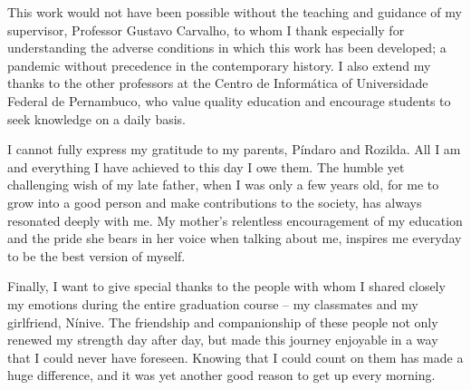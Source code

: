\documentclass[
	12pt,				%
	a4paper,			%
	oneside,
	english			%
	]{abntex2}
\theoremstyle{definition}
\begin{document}

\frenchspacing


\imprimircapa

\imprimirfolhaderosto

\begin{agradecimentos}
This work would not have been possible without the teaching and guidance of my supervisor, Professor Gustavo Carvalho, to whom I thank especially for understanding the adverse conditions in which this work has been developed; a pandemic without precedence in the contemporary history. I also extend my thanks to the other professors at the Centro de Informática of Universidade Federal de Pernambuco, who value quality education and encourage students to seek knowledge on a daily basis.

I cannot fully express my gratitude to my parents, Píndaro and Rozilda. All I am and everything I have achieved to this day I owe them. The humble yet challenging wish of my late father, when I was only a few years old, for me to grow into a good person and make contributions to the society, has always resonated deeply with me. My mother's relentless encouragement of my education and the pride she bears in her voice when talking about me, inspires me everyday to be the best version of myself.

Finally, I want to give special thanks to the people with whom I shared closely my emotions during the entire graduation course -- my classmates and my girlfriend, Nínive. The friendship and companionship of these people not only renewed my strength day after day, but made this journey enjoyable in a way that I could never have foreseen. Knowing that I could count on them has made a huge difference, and it was yet another good reason to get up every morning.
\end{agradecimentos}

\end{document}
